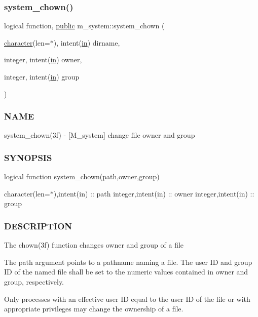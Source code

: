 \subsubsection{\texorpdfstring{system\+\_\+chown()}{system\_chown()}}
{\footnotesize\ttfamily logical function, \hyperlink{M__stopwatch_83_8txt_a2f74811300c361e53b430611a7d1769f}{public} m\+\_\+system\+::system\+\_\+chown (\begin{DoxyParamCaption}\item[{\hyperlink{option__stopwatch_83_8txt_abd4b21fbbd175834027b5224bfe97e66}{character}(len=$\ast$), intent(\hyperlink{M__journal_83_8txt_afce72651d1eed785a2132bee863b2f38}{in})}]{dirname,  }\item[{integer, intent(\hyperlink{M__journal_83_8txt_afce72651d1eed785a2132bee863b2f38}{in})}]{owner,  }\item[{integer, intent(\hyperlink{M__journal_83_8txt_afce72651d1eed785a2132bee863b2f38}{in})}]{group }\end{DoxyParamCaption})}



\subsubsection*{N\+A\+ME}

system\+\_\+chown(3f) -\/ \mbox{[}M\+\_\+system\mbox{]} change file owner and group 

\subsubsection*{S\+Y\+N\+O\+P\+S\+IS}

logical function system\+\_\+chown(path,owner,group)

character(len=$\ast$),intent(in) \+:\+: path integer,intent(in) \+:\+: owner integer,intent(in) \+:\+: group

\subsubsection*{D\+E\+S\+C\+R\+I\+P\+T\+I\+ON}

The chown(3f) function changes owner and group of a file

The path argument points to a pathname naming a file. The user ID and group ID of the named file shall be set to the numeric values contained in owner and group, respectively.

Only processes with an effective user ID equal to the user ID of the file or with appropriate privileges may change the ownership of a file.

